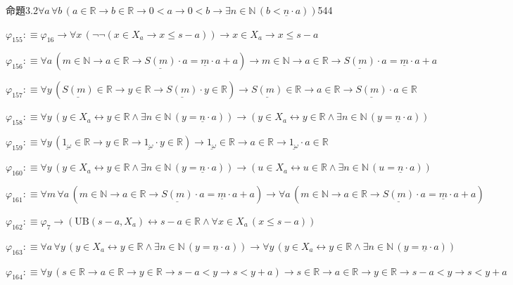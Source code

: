 \begin{fullproof}{命題3.2}{$\forall a\,\forall b\,(a \in \mathbb{R} \to b \in \mathbb{R} \to 0 < a \to 0 < b \to \exists n \in \mathbb{N}\,(b < \underline{n} \cdot a))$}{544}
\begin{abbrevlist}
\item $\varphi_{155} :\equiv \varphi_{16} \to \forall x\,(\neg \neg (x \in X_{a} \to x \leq s - a)) \to x \in X_{a} \to x \leq s - a$
\item $\varphi_{156} :\equiv \forall a\,(m \in \mathbb{N} \to a \in \mathbb{R} \to \underline{S(m)} \cdot a = \underline{m} \cdot a + a) \to m \in \mathbb{N} \to a \in \mathbb{R} \to \underline{S(m)} \cdot a = \underline{m} \cdot a + a$
\item $\varphi_{157} :\equiv \forall y\,(\underline{S(m)} \in \mathbb{R} \to y \in \mathbb{R} \to \underline{S(m)} \cdot y \in \mathbb{R}) \to \underline{S(m)} \in \mathbb{R} \to a \in \mathbb{R} \to \underline{S(m)} \cdot a \in \mathbb{R}$
\item $\varphi_{158} :\equiv \forall y\,(y \in X_{a} \leftrightarrow y \in \mathbb{R} \land \exists n \in \mathbb{N}\,(y = \underline{n} \cdot a)) \to (y \in X_{a} \leftrightarrow y \in \mathbb{R} \land \exists n \in \mathbb{N}\,(y = \underline{n} \cdot a))$
\item $\varphi_{159} :\equiv \forall y\,(\underline{1_{\omega}} \in \mathbb{R} \to y \in \mathbb{R} \to \underline{1_{\omega}} \cdot y \in \mathbb{R}) \to \underline{1_{\omega}} \in \mathbb{R} \to a \in \mathbb{R} \to \underline{1_{\omega}} \cdot a \in \mathbb{R}$
\item $\varphi_{160} :\equiv \forall y\,(y \in X_{a} \leftrightarrow y \in \mathbb{R} \land \exists n \in \mathbb{N}\,(y = \underline{n} \cdot a)) \to (u \in X_{a} \leftrightarrow u \in \mathbb{R} \land \exists n \in \mathbb{N}\,(u = \underline{n} \cdot a))$
\item $\varphi_{161} :\equiv \forall m\,\forall a\,(m \in \mathbb{N} \to a \in \mathbb{R} \to \underline{S(m)} \cdot a = \underline{m} \cdot a + a) \to \forall a\,(m \in \mathbb{N} \to a \in \mathbb{R} \to \underline{S(m)} \cdot a = \underline{m} \cdot a + a)$
\item $\varphi_{162} :\equiv \varphi_{7} \to (\mathrm{UB}(s - a,X_{a}) \leftrightarrow s - a \in \mathbb{R} \land \forall x \in X_{a}\,(x \leq s - a))$
\item $\varphi_{163} :\equiv \forall a\,\forall y\,(y \in X_{a} \leftrightarrow y \in \mathbb{R} \land \exists n \in \mathbb{N}\,(y = \underline{n} \cdot a)) \to \forall y\,(y \in X_{a} \leftrightarrow y \in \mathbb{R} \land \exists n \in \mathbb{N}\,(y = \underline{n} \cdot a))$
\item $\varphi_{164} :\equiv \forall y\,(s \in \mathbb{R} \to a \in \mathbb{R} \to y \in \mathbb{R} \to s - a < y \to s < y + a) \to s \in \mathbb{R} \to a \in \mathbb{R} \to y \in \mathbb{R} \to s - a < y \to s < y + a$

\end{abbrevlist}
\end{fullproof}

